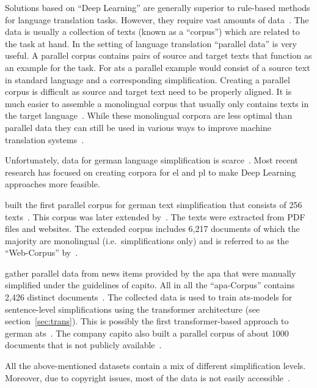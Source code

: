 Solutions based on \enquote{Deep Learning} are generally superior to rule-based methods for language translation tasks.
However, they require vast amounts of data~\autocite{otter2019survey}.
The data is usually a collection of texts (known as a \enquote{corpus}) which are related to the task at hand.
In the setting of language translation \enquote{parallel data} is very useful.
A parallel corpus contains pairs of source and target texts that function as an example for the task.
For \gls{ats} a parallel example would consist of a source text in standard language and a corresponding simplification.
Creating a parallel corpus is difficult as source and target text need to be properly aligned.
It is much easier to assemble a monolingual corpus that usually only contains texts in the target language~\autocite{chan2023routledge}.
While these monolingual corpora are less optimal than parallel data they can still be used in various ways to improve machine translation systems~\autocite{lample2018unsupervised, burlot2019using, chan2023routledge}.

Unfortunately, data for german language simplification is scarce~\autocite{Ansch_tz_2023}.
Most recent research has focused on creating corpora for \gls{el} and \gls{pl} to make Deep Learning approaches more feasible.

\textcite{klaper-etal-2013-building} built the first parallel corpus for german text simplification that consists of 256 texts~\autocite{ebeling2022}.
This corpus was later extended by~\textcite{battisti-etal-2020-corpus}.
The texts were extracted from PDF files and websites.
The extended corpus includes 6,217 documents of which the majority are monolingual (i.e.\ simplifications only) and is referred to as the \enquote{Web-Corpus} by~\textcite{ebeling2022}.

\textcite{sauberli-etal-2020-benchmarking} gather parallel data from news items provided by the \gls{apa} that were manually simplified under the guidelines of \gls{capito}.
All in all the \enquote{\gls{apa}-Corpus} contains 2,426 distinct documents~\autocite{ebeling2022}.
The collected data is used to train \gls{ats}-models for sentence-level simplifications using the transformer architecture (see section~\ref{sec:trans}).
This is possibly the first transformer-based approach to german \gls{ats}~\autocite{Ansch_tz_2023}.
The company \gls{capito} also built a parallel corpus of about 1000 documents that is not publicly available~\autocite{ebeling2022}.

All the above-mentioned datasets contain a mix of different simplification levels.
Moreover, due to copyright issues, most of the data is not easily accessible~\autocite{stodden-etal-2023-deplain}.

